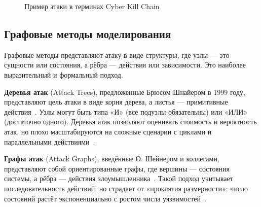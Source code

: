 \begin{figure}[h]
\centering
{}
\caption{Пример атаки в терминах Cyber Kill Chain}
\label{fig:killchain_example}
\end{figure}

\subsection{Графовые методы моделирования}

Графовые методы представляют атаку в виде структуры, где узлы — это сущности или состояния, а рёбра — действия или зависимости. Это наиболее выразительный и формальный подход.

\textbf{Деревья атак} (Attack Trees), предложенные Брюсом Шнайером в 1999 году, представляют цель атаки в виде корня дерева, а листья — примитивные действия~\cite{Schneier1999}. Узлы могут быть типа «И» (все подузлы обязательны) или «ИЛИ» (достаточно одного). Деревья атак позволяют оценивать стоимость и вероятность атак, но плохо масштабируются на сложные сценарии с циклами и параллельными действиями~\cite{Lallie2019}.

\textbf{Графы атак} (Attack Graphs), введённые О. Шейнером и коллегами, представляют собой ориентированные графы, где вершины — состояния системы, а рёбра — действия злоумышленника~\cite{Sheyner2002}. Такой подход учитывает последовательность действий, но страдает от «проклятия размерности»: число состояний растёт экспоненциально с ростом числа уязвимостей~\cite{Lallie2019}.

